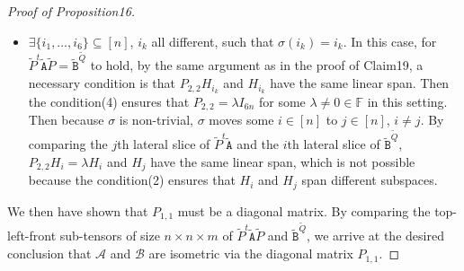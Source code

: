 \documentclass[10pt,a4paper]{article}
\begin{document}
\begin{proof}[Proof of Proposition16]
\begin{itemize}
But the condition(3) excludes the existence of such $P_{2,2}$, so this cannot happen.
\item $\exists\{i_1,\ldots,i_6\}\subseteq[n]$, $i_k$ all different, such that $\sigma(i_k)=i_k$. In this case, for $\widetilde P^t\widetilde{\mathtt A}\widetilde P=\widetilde{\mathtt B}^{\widetilde Q}$ to hold, by the same argument as in the proof of Claim19, a necessary condition is that $P_{2,2}H_{i_k}$ and $H_{i_k}$ have the same linear span. Then the condition(4) ensures that $P_{2,2}=\lambda I_{6n}$ for some $\lambda\ne0\in\mathbb F$ in this setting. Then because $\sigma$ is non-trivial, $\sigma$ moves some $i\in[n]$ to $j\in[n]$, $i\ne j$. By comparing the $j$th lateral slice of $\widetilde P^t\widetilde{\mathtt A}$ and the $i$th lateral slice of $\widetilde{\mathtt B}^{\widetilde Q}$, $P_{2,2}H_i=\lambda H_i$ and $H_j$ have the same linear span, which is not possible because the condition(2) ensures that $H_i$ and $H_j$ span different subspaces.
\end{itemize}
We then have shown that $P_{1,1}$ must be a diagonal matrix. By comparing the top-left-front sub-tensors of size $n\times n\times m$ of $\widetilde P^t\widetilde{\mathtt A}\widetilde P$ and $\widetilde{\mathtt B}^{\widetilde Q}$, we arrive at the desired conclusion that $\mathcal A$ and $\mathcal B$ are isometric via the diagonal matrix $P_{1,1}$.
\end{proof}
\end{document}
